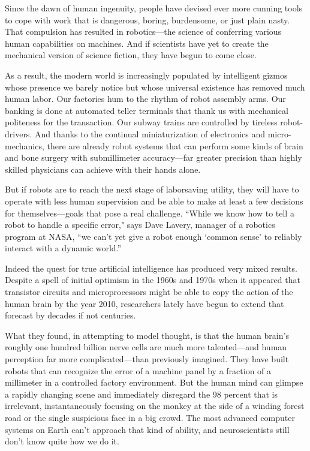 Since the dawn of human ingenuity, people have devised ever more cunning
tools to cope with work that is dangerous, boring, burdensome, or just
plain nasty. That compulsion has resulted in robotics---the science of
conferring various human capabilities on machines. And if scientists
have yet to create the mechanical version of science fiction, they have
begun to come close.

As a result, the modern world is increasingly populated by intelligent
gizmos whose presence we barely notice but whose universal existence has
removed much human labor. Our factories hum to the rhythm of robot
assembly arms. Our banking is done at automated teller terminals that
thank us with mechanical politeness for the transaction. Our subway
trains are controlled by tireless robot-drivers. And thanks to the
continual miniaturization of electronics and micro-mechanics, there are
already robot systems that can perform some kinds of brain and bone
surgery with submillimeter accuracy---far greater precision than highly
skilled physicians can achieve with their hands alone.

But if robots are to reach the next stage of laborsaving utility, they
will have to operate with less human supervision and be able to make at
least a few decisions for themselves---goals that pose a real challenge.
``While we know how to tell a robot to handle a specific error," says
Dave Lavery, manager of a robotics program at NASA, ``we can't yet give
a robot enough `common sense' to reliably interact with a dynamic
world.''

Indeed the quest for true artificial intelligence has produced very
mixed results. Despite a spell of initial optimism in the 1960s and
1970s when it appeared that transistor circuits and microprocessors
might be able to copy the action of the human brain by the year 2010,
researchers lately have begun to extend that forecast by decades if not
centuries.

What they found, in attempting to model thought, is that the human
brain's roughly one hundred billion nerve cells are much more
talented---and human perception far more complicated---than previously
imagined. They have built robots that can recognize the error of a
machine panel by a fraction of a millimeter in a controlled factory
environment. But the human mind can glimpse a rapidly changing scene and
immediately disregard the 98 percent that is irrelevant, instantaneously
focusing on the monkey at the side of a winding forest road or the
single suspicious face in a big crowd. The most advanced computer
systems on Earth can't approach that kind of ability, and
neuroscientists still don't know quite how we do it.


